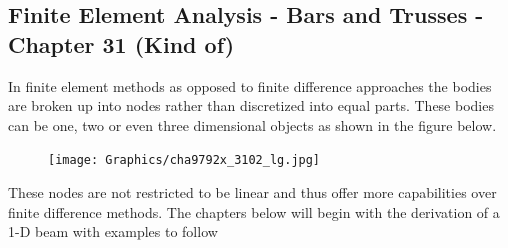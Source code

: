 \subsection{Finite Element Analysis - Bars and Trusses - Chapter 31
  (Kind of)}

In finite element methods as opposed to finite difference approaches
the bodies are broken up into nodes rather than discretized into equal
parts. These bodies can be one, two or even three dimensional objects
as shown in the figure below.

\begin{figure}[H]
  \begin{center}
    \texttt{[image: Graphics/cha9792x\_3102\_lg.jpg]}
  \end{center}
\end{figure}

These nodes are not restricted to be linear and thus offer more
capabilities over finite difference methods. The chapters below will
begin with the derivation of a 1-D beam with examples to follow

